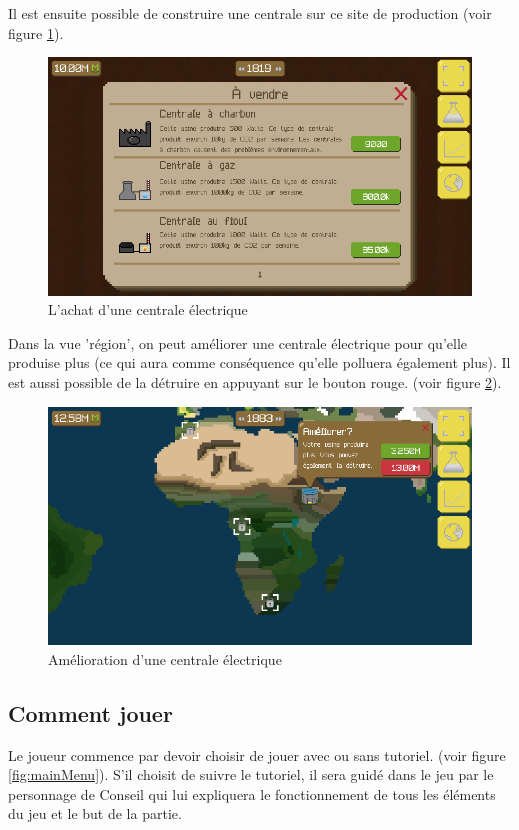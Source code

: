\documentclass{article}
\begin{document}
        Il est ensuite possible de construire une centrale sur ce site de production (voir figure \ref{fig:buyPlant}).
        \begin{figure}[H]
                \includegraphics[width=\linewidth]{../images/buyPlant}
                \caption{L'achat d'une centrale électrique}
                \label{fig:buyPlant}
        \end{figure}
        
        
        Dans la vue 'région', on peut améliorer une centrale électrique pour qu'elle produise plus (ce qui aura comme conséquence qu'elle polluera également plus). Il est aussi possible de la détruire en appuyant sur le bouton rouge. (voir figure \ref{fig:upgradePlant}).
        \begin{figure}[H]
                \includegraphics[width=\linewidth]{../images/upgradePlant}
                \caption{Amélioration d'une centrale électrique}
                \label{fig:upgradePlant}
        \end{figure}
        
        
        \subsection{Comment jouer}
        Le joueur commence par devoir choisir de jouer avec ou sans tutoriel. (voir figure \ref{fig:mainMenu}).
        S'il choisit de suivre le tutoriel, il sera guidé dans le jeu par le personnage de Conseil qui lui expliquera le fonctionnement de tous les éléments du jeu et le but de la partie. 
        
\end{document}
